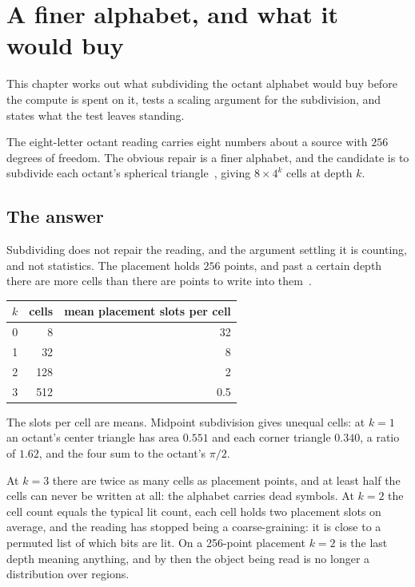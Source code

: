 \chapter{A finer alphabet, and what it would buy}

This chapter works out what subdividing the octant alphabet would buy before the compute is spent on it, tests a scaling argument for the subdivision, and states what the test leaves standing.

The eight-letter octant reading carries eight numbers about a source with \(256\) degrees of freedom. The obvious repair is a finer alphabet, and the candidate is to subdivide each octant's spherical triangle~\cite{src:Baumgardner-and-Frederickson-1985,src:Gorski-et-al-2005}, giving \(8 \times 4^k\) cells at depth \(k\).

\section{The answer}

Subdividing does not repair the reading, and the argument settling it is counting, and not statistics. The placement holds \(256\) points, and past a certain depth there are more cells than there are points to write into them~\cite{src:Feller-1968}.

\begin{center}
\begin{tabular}{@{}rrr@{}}
\toprule
\(k\) & cells & mean placement slots per cell \\
\midrule
0 & 8 & 32 \\
1 & 32 & 8 \\
2 & 128 & 2 \\
3 & 512 & 0.5 \\
\bottomrule
\end{tabular}
\end{center}

The slots per cell are means. Midpoint subdivision gives unequal cells: at \(k = 1\) an octant's center triangle has area \(0.551\) and each corner triangle \(0.340\), a ratio of \(1.62\), and the four sum to the octant's \(\pi/2\).

At \(k = 3\) there are twice as many cells as placement points, and at least half the cells can never be written at all: the alphabet carries dead symbols. At \(k = 2\) the cell count equals the typical lit count, each cell holds two placement slots on average, and the reading has stopped being a coarse-graining: it is close to a permuted list of which bits are lit. On a 256-point placement \(k = 2\) is the last depth meaning anything, and by then the object being read is no longer a distribution over regions.

